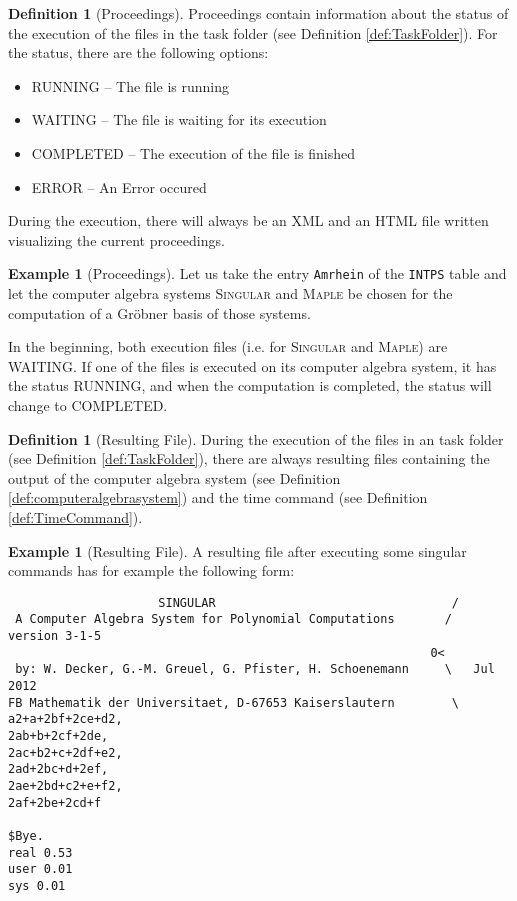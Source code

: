 \documentclass[11pt,a4paper]{amsart}
\numberwithin{equation}{section}
\theoremstyle{definition}
\newtheorem{definition}[theorem]{Definition}
\newtheorem{example}[theorem]{Example}
\begin{document}
\begin{definition}[Proceedings]
\label{def:Proceedings}
Proceedings contain information about the status of the execution of
the files in the task folder (see Definition
\ref{def:TaskFolder}). For the status, there are the following
options:
\begin{itemize}
  \item RUNNING     -- The file is running
  \item WAITING      -- The file is waiting for its execution
  \item COMPLETED -- The execution of the file is finished
  \item ERROR          -- An Error occured
\end{itemize}
During the execution, there will always be an XML and an HTML file
written visualizing the current proceedings.
\end{definition}

\begin{example}[Proceedings]
Let us take the entry \texttt{Amrhein} of the \texttt{INTPS} table and
let the computer algebra systems \textsc{Singular} and \textsc{Maple}
be chosen for the computation of a Gr\"obner basis of those
systems.

In the beginning, both execution files (i.e. for \textsc{Singular} and
\textsc{Maple}) are WAITING. If one of the files is executed on its
computer algebra system, it has the status RUNNING, and when the
computation is completed, the status will change to COMPLETED.
\end{example}

\begin{definition}[Resulting File]
\label{def:ResultingFile}
During the execution of the files in an task folder (see Definition
\ref{def:TaskFolder}), there are always resulting files containing the
output of the computer algebra system (see Definition
\ref{def:computeralgebrasystem}) and the time command (see Definition \ref{def:TimeCommand}).
\end{definition}

\begin{example}[Resulting File]
A resulting file after executing some singular commands has for
example the following form:
\begin{verbatim}
                     SINGULAR                                 /
 A Computer Algebra System for Polynomial Computations       /   version 3-1-5
                                                           0<
 by: W. Decker, G.-M. Greuel, G. Pfister, H. Schoenemann     \   Jul 2012
FB Mathematik der Universitaet, D-67653 Kaiserslautern        \
a2+a+2bf+2ce+d2,
2ab+b+2cf+2de,
2ac+b2+c+2df+e2,
2ad+2bc+d+2ef,
2ae+2bd+c2+e+f2,
2af+2be+2cd+f

$Bye.
real 0.53
user 0.01
sys 0.01
\end{verbatim}
\end{example}

\printindex
\end{document}
